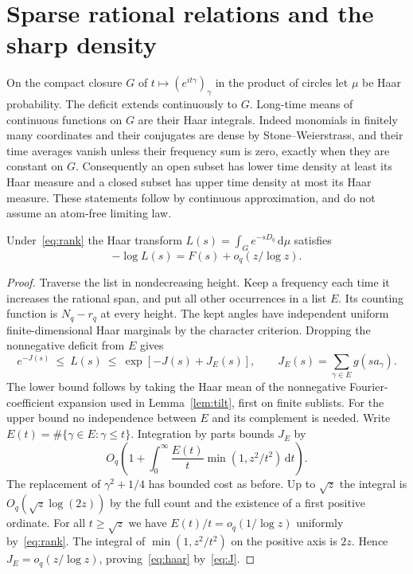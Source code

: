 \documentclass[11pt]{article}
\newcommand{\dd}{\,\mathrm d}\newcommand{\meas}{\operatorname{meas}}
\begin{document}
\section{Sparse rational relations and the sharp density}
On the compact closure $G$ of $t\mapsto(e^{it\gamma})_\gamma$ in the product of circles let $\mu$ be Haar probability. The deficit extends continuously to $G$. Long-time means of continuous functions on $G$ are their Haar integrals. Indeed monomials in finitely many coordinates and their conjugates are dense by Stone--Weierstrass, and their time averages vanish unless their frequency sum is zero, exactly when they are constant on $G$. Consequently an open subset has lower time density at least its Haar measure and a closed subset has upper time density at most its Haar measure. These statements follow by continuous approximation, and do not assume an atom-free limiting law.

\begin{lemma}\label{lem:sparse}
Under~\eqref{eq:rank} the Haar transform $L(s)=\int_G e^{-sD_q}\dd\mu$ satisfies
\begin{equation}\label{eq:haar}
 -\log L(s)=F(s)+o_q(z/\log z).
\end{equation}
\end{lemma}
\begin{proof}
Traverse the list in nondecreasing height. Keep a frequency each time it increases the rational span, and put all other occurrences in a list $E$. Its counting function is $N_q-r_q$ at every height. The kept angles have independent uniform finite-dimensional Haar marginals by the character criterion. Dropping the nonnegative deficit from $E$ gives
\[
 e^{-J(s)}\ \le\ L(s)\ \le\ \exp[-J(s)+J_E(s)],\qquad
 J_E(s)=\sum_{\gamma\in E}g(sa_\gamma).
\]
The lower bound follows by taking the Haar mean of the nonnegative Fourier-coefficient expansion used in Lemma~\ref{lem:tilt}, first on finite sublists. For the upper bound no independence between $E$ and its complement is needed. Write $E(t)=\#\{\gamma\in E:\gamma\le t\}$. Integration by parts bounds $J_E$ by
\[
 O_q\left(1+\int_0^\infty\frac{E(t)}{t}\min(1,z^2/t^2)\dd t\right).
\]
The replacement of $\gamma^2+1/4$ has bounded cost as before. Up to $\sqrt z$ the integral is $O_q(\sqrt z\log(2z))$ by the full count and the existence of a first positive ordinate. For all $t\ge\sqrt z$ we have $E(t)/t=o_q(1/\log z)$ uniformly by~\eqref{eq:rank}. The integral of $\min(1,z^2/t^2)$ on the positive axis is $2z$. Hence $J_E=o_q(z/\log z)$, proving~\eqref{eq:haar} by~\eqref{eq:J}.
\end{proof}
\end{document}
